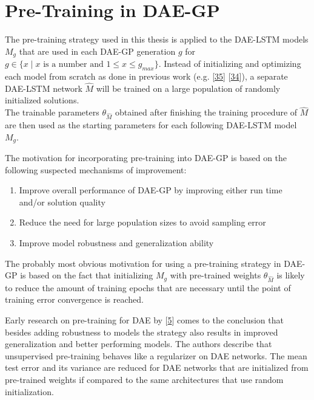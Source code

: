 \documentclass[
  11pt,
]{article}
\providecommand{\tightlist}{%
  \setlength{\itemsep}{0pt}\setlength{\parskip}{0pt}}
\begin{document}
\hypertarget{pre-training-in-dae-gp}{%
\section{Pre-Training in DAE-GP}\label{pre-training-in-dae-gp}}

The pre-training strategy used in this thesis is applied to the DAE-LSTM models \(M_g\) that are used in each DAE-GP generation \(g\) for \(g \in \{{x \mid x \text{ is a number and } 1 \leq x \leq g_{max}}\}\).
Instead of initializing and optimizing each model from scratch as done in previous work (e.g. {[}\protect\hyperlink{ref-dae-gp_2020_rtree}{35}{]} {[}\protect\hyperlink{ref-dae-gp_2022_symreg}{34}{]}), a separate DAE-LSTM network \(\hat{M}\) will be trained on a large population of randomly initialized solutions.\\

The trainable parameters \(\theta_{\hat{M}}\) obtained after finishing the training procedure of \(\hat{M}\) are then used as the starting parameters for each following DAE-LSTM model \(M_g\).

The motivation for incorporating pre-training into DAE-GP is based on the following suspected mechanisms of improvement:

\begin{enumerate}
\def\labelenumi{\arabic{enumi}.}
\tightlist
\item
  Improve overall performance of DAE-GP by improving either run time and/or solution quality
\item
  Reduce the need for large population sizes to avoid sampling error
\item
  Improve model robustness and generalization ability
\end{enumerate}

The probably most obvious motivation for using a pre-training strategy in DAE-GP is based on the fact that initializing \(M_g\) with pre-trained weights \(\theta_{\hat{M}}\) is likely to reduce the amount of training epochs that are necessary until the point of training error convergence is reached.

Early research on pre-training for DAE by {[}\protect\hyperlink{ref-pmlr-v5-erhan09a}{5}{]} comes to the conclusion that besides adding robustness to models the strategy also results in improved generalization and better performing models.
The authors describe that unsupervised pre-training behaves like a regularizer on DAE networks.
The mean test error and its variance are reduced for DAE networks that are initialized from pre-trained weights if compared to the same architectures that use random initialization.
\end{document}
